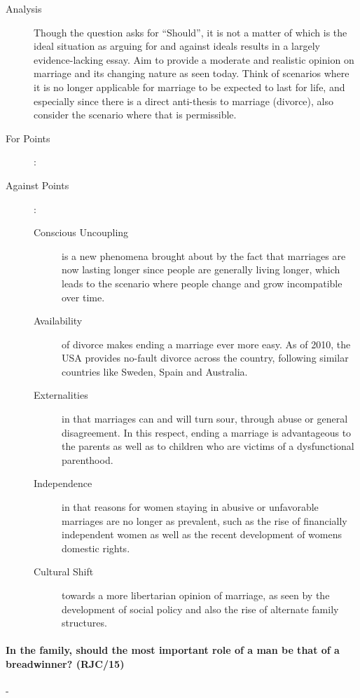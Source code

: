 \documentclass[../../main]{subfiles}
\begin{document}
\begin{description}
	\item[Analysis] Though the question asks for ``Should'', it is not a matter of which is the ideal situation as arguing for and against ideals results in a largely evidence-lacking essay. Aim to provide a moderate and realistic opinion on marriage and its changing nature as seen today. Think of scenarios where it is no longer applicable for marriage to be expected to last for life, and especially since there is a direct anti-thesis to marriage (divorce), also consider the scenario where that is permissible.
	\item[For Points] :
		\begin{description}
			\item[]
		\end{description}
	\item[Against Points] :
		\begin{description}
			\item[Conscious Uncoupling] is a new phenomena brought about by the fact that marriages are now lasting longer since people are generally living longer, which leads to the scenario where people change and grow incompatible over time.
			\item[Availability] of divorce makes ending a marriage ever more easy. As of 2010, the USA provides no-fault divorce across the country, following similar countries like Sweden, Spain and Australia.
			\item[Externalities] in that marriages can and will turn sour, through abuse or general disagreement. In this respect, ending a marriage is advantageous to the parents as well as to children who are victims of a dysfunctional parenthood.
			\item[Independence] in that reasons for women staying in abusive or unfavorable marriages are no longer as prevalent, such as the rise of financially independent women as well as the recent development of womens domestic rights.
			\item[Cultural Shift] towards a more libertarian opinion of marriage, as seen by the development of social policy and also the rise of alternate family structures.
		\end{description}
\end{description}

\paragraph{In the family, should the most important role of a man be that of a breadwinner? (RJC/15)}-
\end{document}
